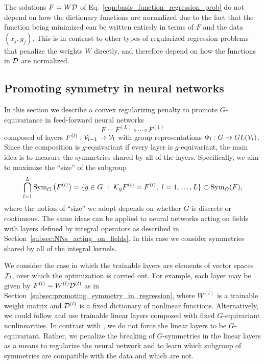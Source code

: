 \documentclass[twoside,11pt]{article}
\begin{document}
\begin{remark}
    The solutions $F = W{\mathcal{D}}$ of Eq.~\ref{eqn:basis_function_regression_prob} do not depend on how the dictionary functions are normalized due to the fact that the function being minimized can be written entirely in terms of $F$ and the data $(x_j,y_j)$.
    This is in contrast to other types of regularized regression problems that penalize the weights $W$ directly, and therefore depend on how the functions in ${\mathcal{D}}$ are normalized.
\end{remark}

\subsection{Promoting symmetry in neural networks}
\label{subsec:multilayer_perceptrons}
In this section we describe a convex regularizing penalty to promote $G$-equivariance in feed-forward neural networks
\begin{equation}
    F = F^{(L)} \circ \cdots \circ F^{(1)}
\end{equation}
composed of layers 
$F^{(l)}: {\mathcal{V}}_{l-1} \to {\mathcal{V}}_l$
with group representations 
$\Phi_l : G \to GL({\mathcal{V}}_l)$.
Since the composition is $g$-equivariant if every layer is $g$-equivariant, the main idea is to measure the symmetries shared by all of the layers.
Specifically, we aim to maximize the ``size'' of the subgroup
\begin{equation}
    \bigcap_{l=1}^L \operatorname{Sym}_G\big(F^{(l)}\big) 
    = \{ g \in G \ : \ {\mathcal{K}}_g F^{(l)} = F^{(l)},\ l=1, \ldots, L \}
    \subset \operatorname{Sym}_G(F),
    \label{eqn:intersection_subgroup}
\end{equation}
where the notion of ``size'' we adopt depends on whether $G$ is discrete or continuous.
The same ideas can be applied to neural networks acting on fields with layers defined by integral operators as described in Section~\ref{subsec:NNs_acting_on_fields}.
In this case we consider symmetries shared by all of the integral kernels.

We consider the case in which the trainable layers are elements of vector spaces ${\mathcal{F}}_l$, over which the optimization is carried out.
For example, each layer may be given by $F^{(l)} = W^{(l)}\mathcal{D}^{(l)}$ as in Section~\ref{subsec:promoting_symmetry_in_regression}, where $W^{(l)}$ is a trainable weight matrix and $\mathcal{D}^{(l)}$ is a fixed dictionary of nonlinear functions.
Alternatively, we could follow \cite{Finzi2021practical} and use trainable linear layers composed with fixed $G$-equivariant nonlinearities.
In contrast with \cite{Finzi2021practical}, we do not force the linear layers to be $G$-equivariant.
Rather, we penalize the breaking of $G$-symmetries in the linear layers as a means to regularize the neural network and to learn which subgroup of symmetries are compatible with the data and which are not.
\end{document}
